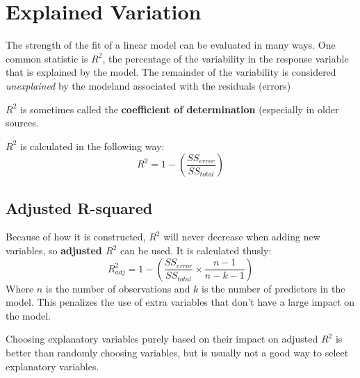 \documentclass[titlepage, 12pt, leqno]{article}
\begin{document}
\pagebreak
\section{Explained Variation}
The strength of the fit of a linear model can be evaluated in many ways. One common statistic is $R^2$, the percentage of the variability in the response variable that is explained by the model. The remainder of the variability is considered \textit{unexplained} by the modeland associated with the residuals (errors)

$R^2$ is sometimes called the \textbf{coefficient of determination} (especially in older sources.

$R^2$ is calculated in the following way:
\[
    R^2 = 1 - \left(\frac{SS_{error}}{SS_{total}}\right) 
\]
\subsection{Adjusted R-squared}
Because of how it is constructed, $R^2$ will never decrease when adding new variables, so \textbf{adjusted $R^2$} can be used. It is calculated thusly:
\[
    R^2_{adj} = 1 - \left(\frac{SS_{error}}{SS_{total}} \times \frac{n-1}{n-k-1} \right)
\]
Where $n$ is the number of observations and $k$ is the number of predictors in the model. This penalizes the use of extra variables that don't have a large impact on the model.

\begin{note}
    Choosing explanatory variables purely based on their impact on adjusted $R^2$ is better than randomly choosing variables, but is usually not a good way to select explanatory variables.
\end{note}
\end{document}
